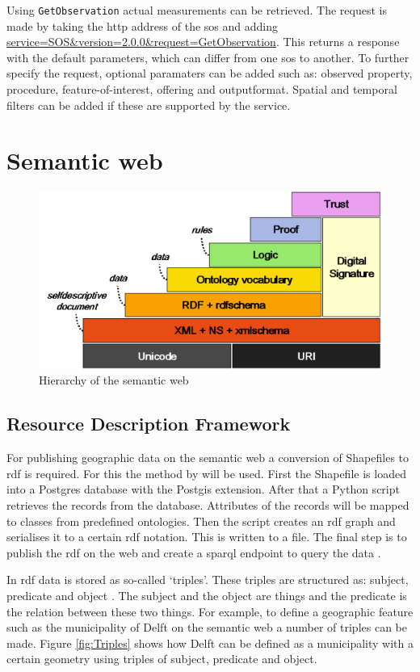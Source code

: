 Using \texttt{GetObservation} actual measurements can be retrieved. The request is made by taking the \ac{http} address of the \ac{sos} and adding \url{service=SOS\&version=2.0.0\&request=GetObservation}. This returns a response with the default parameters, which can differ from one \ac{sos} to another. To further specify the request, optional paramaters can be added such as: observed property, procedure, feature-of-interest, offering and outputformat. Spatial and temporal filters can be added if these are supported by the service. 

\section{Semantic web}


\begin{figure}
	\centering
	\includegraphics[width=0.7\linewidth]{figs/semanticweb.png}
	\caption{Hierarchy of the semantic web \citep{LD:Koivunen}}
	\label{fig:SemanticWeb}
\end{figure}

\subsection{Resource Description Framework}
For publishing geographic data on the semantic web a conversion of Shapefiles to \ac{rdf} is required. For this the method by \cite{LD:Missier} will be used. First the Shapefile is loaded into a Postgres database with the Postgis extension. After that a Python script retrieves the records from the database. Attributes of the records will be mapped to classes from predefined ontologies. Then the script creates an \ac{rdf} graph and serialises it to a certain \ac{rdf} notation. This is written to a file. The final step is to publish the \ac{rdf} on the web and create a \ac{sparql} endpoint to query the data \citep{LD:Missier}. 

In \ac{rdf} data is stored as so-called `triples'. These triples are structured as: subject, predicate and object \citep{LD:Berners-lee}. The subject and the object are things and the predicate is the relation between these two things. For example, to define a geographic feature such as the municipality of Delft on the semantic web a number of triples can be made. Figure \ref{fig:Triples} shows how Delft can be defined as a municipality with a certain geometry using triples of subject, predicate and object.

